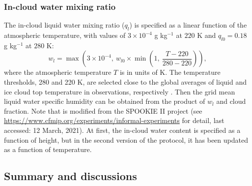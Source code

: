 \subsubsection{In-cloud water mixing ratio}
\label{sec:in_cloud_water}

The in-cloud liquid water mixing ratio ($q_l$) is specified as a linear function of the atmospheric temperature, with values of $3\times 10^{-4}$ g kg$^{-1}$ at $220$ K and $q_{l0}=0.18$ g kg$^{-1}$ at $280$ K:
\begin{equation}
	w_l = \max\left(3\times 10^{-4}, ~w_{l0}\times  \min\left(1, ~\frac{T-220}{280-220}\right)\right),
	\label{eq:qcl}
\end{equation}
where the atmospheric temperature $T$ is in units of K. The temperature thresholds, 280 and 220 K, are selected close to the global averages of liquid and ice cloud top temperature in observations, respectively \citep[Fig. 4 in][]{Stubenrauch2013}. Then the grid mean liquid water specific humidity can be obtained from the product of $w_l$ and cloud fraction. Note that  is modified from the SPOOKIE II project (see \url{https://www.cfmip.org/experiments/informal-experiments} for detail, last accessed: 12 March, 2021). At first, the in-cloud water content is specified as a function of height, but in the second version of the protocol, it has been updated as a function of temperature.

\subsection{Summary and discussions}


